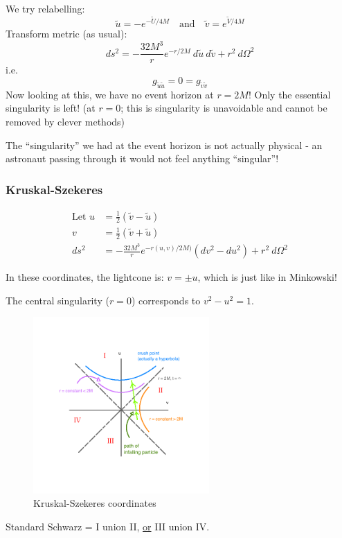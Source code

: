 \documentclass[a4paper]{article} %
\renewcommand{\tilde}{\widetilde}
\begin{document}
We try relabelling:
\begin{equation}
\tilde{u}=-e^{-\tilde{U}/4M}\quad\text{and}\quad \tilde{v}=e^{\tilde{V}/4M}
\end{equation}
Transform metric (as usual):
\begin{equation}
ds^2 = -\frac{32M^3}{r}e^{-r/2M}~d\tilde{u}~d\tilde{v}+r^2~d\Omega^2
\end{equation}
i.e.
\begin{equation}
g_{\tilde{u}\tilde{u}}=0=g_{\tilde{v}\tilde{v}}
\end{equation}
Now looking at this, we have no event horizon at $r=2M$! Only the essential singularity is left! (at $r=0$; this is singularity is unavoidable and cannot be removed by clever methods)

The ``singularity'' we had at the event horizon is not actually physical - an astronaut passing through it would not feel anything ``singular''!

\subsubsection{Kruskal-Szekeres}
\begin{align}
\text{Let }u&=\frac{1}{2}(\tilde{v}-\tilde{u})\\
v&=\frac{1}{2}(\tilde{v}+\tilde{u})\\
ds^2&=-\frac{32M^3}{r}e^{-r(u,v)/2M)}(dv^2 - du^2) + r^2~d\Omega^2
\end{align}

In these coordinates, the lightcone is: $v = \pm u$, which is just like in Minkowski!

The central singularity ($r=0$) corresponds to $v^2 - u^2 = 1$.

\begin{figure}[h]
\centering
\includegraphics[width=0.6\textwidth]{images/ks-coords.png}
\caption{Kruskal-Szekeres coordinates}
\end{figure}
Standard Schwarz = I union II, \underline{or} III union IV.
\end{document}
